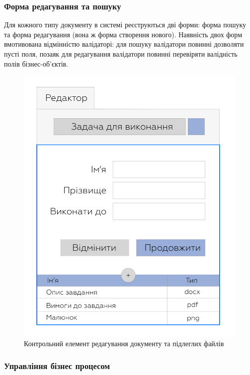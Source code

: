 \subsubsection{Форма редагування та пошуку}

Для кожного типу документу в системі реєструються дві форми: форма пошуку
та форма редагування (вона ж форма створення нового). Наявність двох форм
вмотивована відмінністю валідаторі: для пошуку валідатори повинні дозволяти пусті поля,
позаяк для редагування валідатори повинні перевіряти валідність полів бізнес-об'єктів.

\begin{figure}[!htbp]
\centerline{\includegraphics[scale=0.3]{editForm.png}}
\caption{Контрольний елемент редагування документу та підлеглих файлів}
\end{figure}

\newpage
\subsubsection{Управління бізнес процесом}

